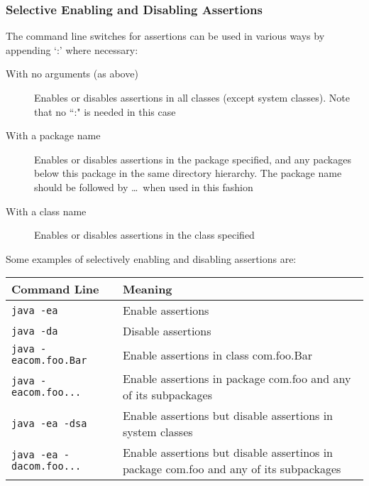 \subsubsection{Selective Enabling and Disabling Assertions}
The command line switches for assertions can be used in various ways by 
appending `:' where necessary:
\begin{description}
    \item[With no arguments (as above)] Enables or disables assertions in all 
    classes (except system classes). Note that no ``:" is needed in this case
    \item[With a package name] Enables or disables assertions in the package 
    specified, and any packages below this package in the same directory 
    hierarchy. The package name should be followed by \ldots\ when used in this 
    fashion
    \item[With a class name] Enables or disables assertions in the class 
    specified
\end{description}
Some examples of selectively enabling and disabling assertions are:
\begin{center}
    \begin{tabular}{lp{}}
        \textbf{Command Line} & \textbf{Meaning} \\
        \hline
        \verb#java -ea# & Enable assertions \\
        \hline
        \verb#java -da# & Disable assertions \\
        \hline
        \verb#java -eacom.foo.Bar# & Enable assertions in class com.foo.Bar \\
        \hline
        \verb#java -eacom.foo...# & Enable assertions in package com.foo and 
        any of its subpackages \\
        \hline
        \verb#java -ea -dsa# & Enable assertions but disable assertions in 
        system classes \\
        \hline
        \verb#java -ea -dacom.foo...# & Enable assertions but disable 
        assertinos in package com.foo and any of its subpackages \\
    \end{tabular}
\end{center}

